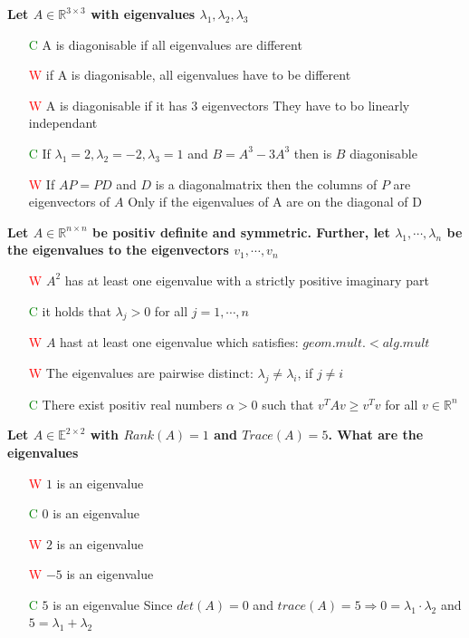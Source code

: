 \documentclass[7pt,landscape, margin = 0.1mm]{article}
\begin{document}
\begin{multicols}{4}
\begin{flushleft}
\begin{itemize}
\end{itemize}
\hspace{3mm} 
\textbf{Let $A  \in \mathbb{R}^{3 \times 3} $ with eigenvalues $\lambda_1, \lambda_2, \lambda_3$}
\begin{itemize}
\item[\textcolor{green}{C}] A is diagonisable if all eigenvalues are different
\item[\textcolor{red}{W}] if A is diagonisable, all eigenvalues have to be different
\item[\textcolor{red}{W}] A is diagonisable if it has 3 eigenvectors
\textcolor{Emerald}{They have to bo linearly independant}
\item[\textcolor{green}{C}]If $\lambda_1 =2, \lambda_2=-2, \lambda_3=1$ and $B=A^3-3A^3$ then is $B$ diagonisable
\item[\textcolor{red}{W}] If $AP=PD$ and $D$ is a diagonalmatrix then the columns of $P$ are eigenvectors of $A$
\textcolor{Emerald}{Only if the eigenvalues of A are on the diagonal of D}
\end{itemize}

\hspace{3mm}


\textbf{Let $A  \in \mathbb{R}^{n \times n} $ be positiv definite and symmetric. Further, let $\lambda_1 , \cdots , \lambda_n $ be the eigenvalues to the eigenvectors  $ v_1 , \cdots ,  v_n$}
\begin{itemize}
\item[\textcolor{red}{W}] $A^2$ has at least one eigenvalue with a strictly positive imaginary part
\item[\textcolor{green}{C}] it holds that $\lambda_j > 0$ for all  $j = 1, \cdots, n $ 
\item[\textcolor{red}{W}] $A$ hast at least one eigenvalue which satisfies: $geom. mult. < alg. mult $
\item[\textcolor{red}{W}] The eigenvalues are pairwise distinct: $\lambda_j \neq \lambda_i $, if $j \neq  i $
\item[\textcolor{green}{C}] There exist positiv real numbers $\alpha > 0 $ such that $v^TAv \geq v^Tv$ for all  $v \in \mathbb{R}^{n} $
\end{itemize}


\textbf{Let $A  \in \mathbb{E}^{2 \times 2} $ with $Rank(A) = 1$ and $Trace(A)=5$. What are the eigenvalues  }
\begin{itemize}
\item[\textcolor{red}{W}] $1$ is an eigenvalue
\item[\textcolor{green}{C}]  $0$ is an eigenvalue
\item[\textcolor{red}{W}] $2$ is an eigenvalue
\item[\textcolor{red}{W}] $-5$ is an eigenvalue
\item[\textcolor{green}{C}]  $5$ is an eigenvalue
\textcolor{Emerald}{Since $det(A)=0 $ and $trace(A)=5 \Rightarrow 0= \lambda_1 \cdot \lambda_2 $ and $5=\lambda_1 + \lambda_2$  } 
\end{itemize}




\end{flushleft}
\end{multicols}
\end{document}
